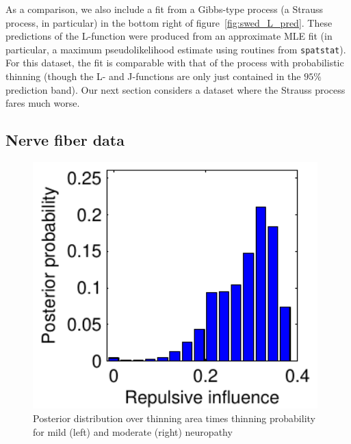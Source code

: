 \documentclass{statsoc}
\begin{document}
As a comparison, we also include a fit from a Gibbs-type process (a Strauss process, in particular) in the bottom right of 
figure~\ref{fig:swed_L_pred}. These
predictions of the L-function were produced from an approximate MLE fit (in particular, a maximum pseudolikelihood estimate
using routines from \texttt{spatstat}). For this dataset, the fit is comparable with
that of the \matern process with probabilistic thinning (though the L- and J-functions are only just contained in the $95\%$ prediction
band). Our next section considers a dataset where the Strauss process fares much worse.
\subsection{Nerve fiber data}
  \begin{figure}
  \centering
  \begin{minipage}[h]{0.22\linewidth}
    \centering \vspace{-.1in}
  \caption{Posterior distribution over thinning area times thinning probability for mild (left) and moderate (right) neuropathy}
  \label{fig:rep_inf}
  \end{minipage}
  \begin{minipage}[h]{0.3\linewidth}
  \centering
  \includegraphics[width=0.98\textwidth]{figs/plot_mild_repuls.pdf}
  \end{minipage}
  \begin{minipage}[h]{0.3\linewidth}
  \centering

\end{minipage}
\end{figure}
\end{document}

